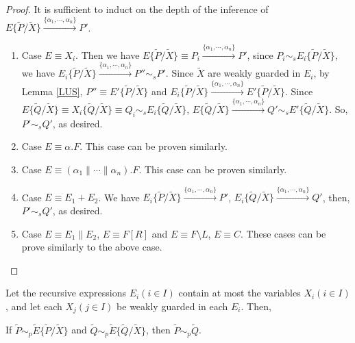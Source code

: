 \begin{proof}
It is sufficient to induct on the depth of the inference of $E\{\widetilde{P}/\widetilde{X}\}\xrightarrow{\{\alpha_1,\cdots,\alpha_n\}}P'$.

\begin{enumerate}
  \item Case $E\equiv X_i$. Then we have $E\{\widetilde{P}/\widetilde{X}\}\equiv P_i\xrightarrow{\{\alpha_1,\cdots,\alpha_n\}}P'$, since $P_i\sim_s E_i\{\widetilde{P}/\widetilde{X}\}$, we have $E_i\{\widetilde{P}/\widetilde{X}\}\xrightarrow{\{\alpha_1,\cdots,\alpha_n\}}P''\sim_s P'$. Since $\widetilde{X}$ are weakly guarded in $E_i$, by Lemma \ref{LUS}, $P''\equiv E'\{\widetilde{P}/\widetilde{X}\}$ and $E_i\{\widetilde{P}/\widetilde{X}\}\xrightarrow{\{\alpha_1,\cdots,\alpha_n\}} E'\{\widetilde{P}/\widetilde{X}\}$. Since $E\{\widetilde{Q}/\widetilde{X}\}\equiv X_i\{\widetilde{Q}/\widetilde{X}\} \equiv Q_i\sim_s E_i\{\widetilde{Q}/\widetilde{X}\}$, $E\{\widetilde{Q}/\widetilde{X}\}\xrightarrow{\{\alpha_1,\cdots,\alpha_n\}}Q'\sim_s E'\{\widetilde{Q}/\widetilde{X}\}$. So, $P'\sim_s Q'$, as desired.
  \item Case $E\equiv\alpha.F$. This case can be proven similarly.
  \item Case $E\equiv(\alpha_1\parallel\cdots\parallel\alpha_n).F$. This case can be proven similarly.
  \item Case $E\equiv E_1+E_2$. We have $E_i\{\widetilde{P}/\widetilde{X}\} \xrightarrow{\{\alpha_1,\cdots,\alpha_n\}}P'$, $E_i\{\widetilde{Q}/\widetilde{X}\} \xrightarrow{\{\alpha_1,\cdots,\alpha_n\}}Q'$, then, $P'\sim_s Q'$, as desired.
  \item Case $E\equiv E_1\parallel E_2$, $E\equiv F[R]$ and $E\equiv F\setminus L$, $E\equiv C$. These cases can be prove similarly to the above case.
\end{enumerate}
\end{proof}

\begin{theorem}\label{USSPB}
Let the recursive expressions $E_i(i\in I)$ contain at most the variables $X_i(i\in I)$, and let each $X_j(j\in I)$ be weakly guarded in each $E_i$. Then,

If $\widetilde{P}\sim_p \widetilde{E}\{\widetilde{P}/\widetilde{X}\}$ and $\widetilde{Q}\sim_p \widetilde{E}\{\widetilde{Q}/\widetilde{X}\}$, then $\widetilde{P}\sim_p \widetilde{Q}$.
\end{theorem}

